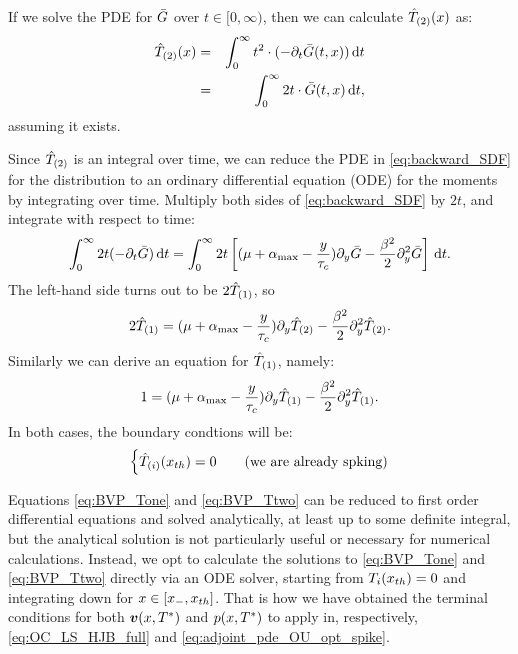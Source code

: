 If we solve the PDE for ${ \bar{G} }$ over $t \in [0,\infty)$, then we can calculate
${ \hat{T}_{(2)} }(x)$ as:
\begin{eqnarray}
{ \hat{T}_{(2)} }(x) &=& \int_0^\infty t^2 \cdot (-{\partial}_t{ \bar{G} }(t,x)) \, \mathrm{d} t
\\
		   &=& \int_0^\infty 2t \cdot { \bar{G} }(t,x) \, \mathrm{d} t,
\end{eqnarray}
assuming it exists.

Since ${ \hat{T}_{(2)} }$ is an integral over time, we can reduce the PDE in
\cref{eq:backward_SDF} for the distribution to an ordinary differential equation
(ODE) for the moments by integrating over time. Multiply both sides of
\cref{eq:backward_SDF} by $2t$, and integrate with respect to time:
\begin{equation}
\int_0^\infty 2t (-{\partial}_t { \bar{G} }) \, \mathrm{d} t
=
\int_0^\infty  2t \left[ ({\mu } + { \alpha_{\textrm{max}} } - \frac y{\tau_c}) {\partial}_y{ \bar{G} } - \frac {\beta^2} 2
{\partial}_y^2 { \bar{G} }\right]
\, \mathrm{d} t.
\end{equation}
The left-hand side turns out to be $2{ \hat{T}_{(1)} }$, so
\begin{equation}  
2{ \hat{T}_{(1)} }
=({\mu } + { \alpha_{\textrm{max}} } - \frac y{\tau_c})   {\partial}_y { \hat{T}_{(2)} }
- \frac {\beta^2} 2
{\partial}_y^2 { \hat{T}_{(2)} }.
\label{eq:BVP_Ttwo}
\end{equation}
Similarly we can derive an equation for ${ \hat{T}_{(1)} }$, namely:
\begin{equation}
1
=({\mu } + { \alpha_{\textrm{max}} } - \frac y{\tau_c})   {\partial}_y { \hat{T}_{(1)} }
- \frac {\beta^2} 2
{\partial}_y^2 { \hat{T}_{(1)} }.
\label{eq:BVP_Tone}
\end{equation}
In both cases, the boundary condtions will be:
\begin{equation}
\begin{cases}
{ \hat{T}_{(i)} }({ x_{th} }) = 0 & \quad (\textrm{we are already spking})
\end{cases}
\label{eq:BVP_Ti_BCs}
\end{equation}

Equations \ref{eq:BVP_Tone} and \ref{eq:BVP_Ttwo} can be reduced to first order
differential equations and solved analytically, at least up to some definite integral,
but the analytical solution is not particularly useful or necessary for
numerical calculations. Instead, we opt to calculate the solutions to
\ref{eq:BVP_Tone} and \ref{eq:BVP_Ttwo} directly via an ODE solver, starting
from $T_i({ x_{th} }) = 0$ and integrating down for $x  \in [{ x_{-} }, { x_{th} }]$.
That is how we have obtained the terminal conditions for both ${ \boldsymbol{v} }(x,{ T^* })$ and
$p(x,{ T^* })$ to apply in, respectively, \cref{eq:OC_LS_HJB_full} and
\cref{eq:adjoint_pde_OU_opt_spike}.


